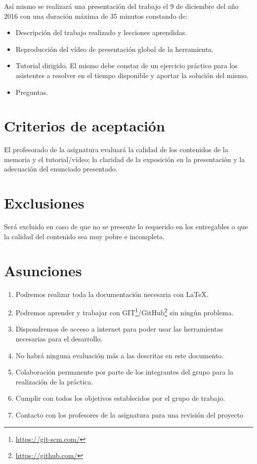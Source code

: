\documentclass[a4paper,10pt]{scrartcl}
\begin{document}
Así mismo se realizará una presentación del trabajo el 9 de diciembre del año 2016 con una duración máxima de 35 minutos constando de:
\begin{itemize}
	\item Descripción del trabajo realizado y lecciones aprendidas.
	
	\item Reproducción del vídeo de presentación global de la herramienta.
	
	\item Tutorial dirigido. El mismo debe constar de un ejercicio práctico para los asistentes a resolver en el tiempo disponible y aportar la solución del mismo.

	\item Preguntas.


\end{itemize}

\section{Criterios de aceptación}
El profesorado de la asignatura evaluará la calidad de los contenidos de la memoria y el tutorial/vídeo; la claridad de la exposición en la presentación y la adecuación del enunciado presentado.

\section{Exclusiones}
Será excluido en caso de que no se presente lo requerido en los entregables o que la calidad del contenido sea muy pobre e incompleta.


\section{Asunciones}

	\begin{enumerate}
		\item Podremos realizar toda la documentación necesaria con \LaTeX.
		
		\item Podremos aprender y trabajar con GIT\footnote{\url{https://git-scm.com/}}/GitHub\footnote{\url{https://github.com/}} sin ningún problema.
		
		\item Dispondremos de acceso a internet para poder usar las herramientas necesarias para el desarrollo.

		\item No habrá ninguna evaluación más a las descritas en este documento.
		
		\item Colaboración permanente por parte de los integrantes del grupo para la realización de la práctica.
		
		\item Cumplir con todos los objetivos establecidos por el grupo de trabajo.
		
		\item Contacto con los profesores de la asignatura para una revisión del proyecto
	\end{enumerate}
\end{document}
